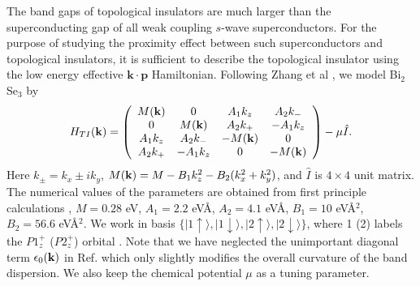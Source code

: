 \documentclass[11pt,revtex,aps]{report}
\def\ket#1{\vert #1 \rangle}
\begin{document}
The band gaps of topological insulators are much larger than the superconducting
gap of all  weak coupling $s$-wave superconductors. 
For the purpose of studying the proximity
effect between such superconductors and topological insulators, it is
sufficient to describe the topological insulator using the 
low energy effective $\mathbf{k}\cdot \mathbf{p}$ Hamiltonian. Following
Zhang et al \cite{zhang}, we model Bi$_2$Se$_3$ by 
\begin{eqnarray}
H_{TI}({\bf k})=
\left( \begin{array}{cccc}
M({\bf k}) & 0 & A_1 k_z  & A_2 k_{-} \\
0 &M({\bf k})& A_2 k_+ & -A_1 k_z \\
 A_1 k_z  & A_2 k_{-} &-M({\bf k}) & 0 \\
A_2 k_+ & -A_1 k_z &0 & -M({\bf k}) \\
 \end{array} \right)-\mu \hat{I}.
 \end{eqnarray}
Here $k_{\pm}=k_x \pm i k_y $, 
$M({\bf k})=M-B_1 k_z ^2 - B_2 (k_x^2 + k_y^2)$, and $\hat{I}$ is $4\times 4$
unit matrix. The numerical values of 
the parameters are obtained from first principle calculations \cite{zhang,band}, $M=0.28$ eV,
$A_1=2.2$ eV\AA, $A_2=4.1$ eV\AA, $B_1=10$ eV\AA$^2$, $B_2=56.6 $ eV\AA$^2$.
We work in basis $\{\ket{1\uparrow}, \ket{1\downarrow},\ket{2\uparrow},\ket{2\downarrow} \}$,
where 1 (2) labels the $P1_z^+$ ($P2_z^+$) orbital \cite{zhang}. Note that
we have neglected the unimportant diagonal term $\epsilon_0({\bf k})$ in Ref. \cite{zhang} which 
only slightly modifies the overall curvature of the band dispersion. We also
keep the chemical potential $\mu$ as a tuning parameter.
\end{document}
